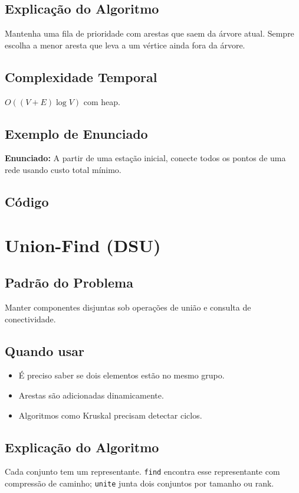 \subsection{Explicação do Algoritmo}
Mantenha uma fila de prioridade com arestas que saem da árvore atual. Sempre escolha a menor aresta que leva a um vértice ainda fora da árvore.

\subsection{Complexidade Temporal}
$O((V + E) \log V)$ com heap.

\subsection{Exemplo de Enunciado}
\begin{exemplodiabox}
\textbf{Enunciado:} A partir de uma estação inicial, conecte todos os pontos de uma rede usando custo total mínimo.
\end{exemplodiabox}

\subsection{Código}

\section{Union-Find (DSU)}

\subsection{Padrão do Problema}
Manter componentes disjuntas sob operações de união e consulta de conectividade.

\subsection{Quando usar}
\begin{itemize}[nosep]
  \item É preciso saber se dois elementos estão no mesmo grupo.
  \item Arestas são adicionadas dinamicamente.
  \item Algoritmos como Kruskal precisam detectar ciclos.
\end{itemize}

\subsection{Explicação do Algoritmo}
Cada conjunto tem um representante. \texttt{find} encontra esse representante com compressão de caminho; \texttt{unite} junta dois conjuntos por tamanho ou rank.

